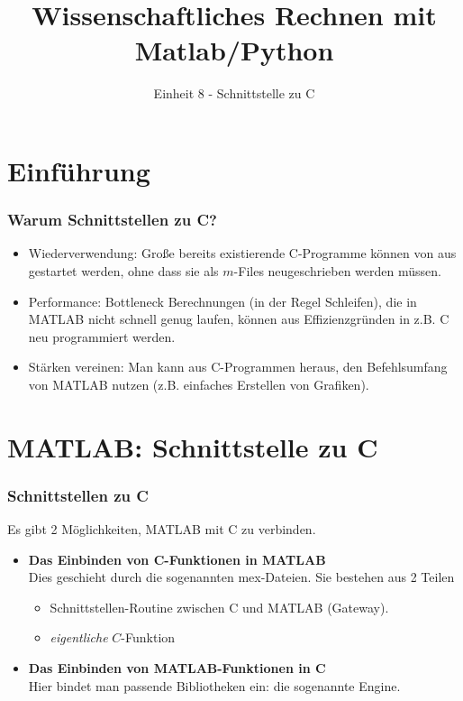 \documentclass[hyperref={xetex}]{beamer}
\title{Wissenschaftliches Rechnen mit Matlab/Python}
\subtitle{Einheit 8 - Schnittstelle zu C}
\begin{document}
\titlepage
\section{Einführung}
%
%
%
%
\begin{frame}[fragile]\frametitle{Warum Schnittstellen zu C?}
\begin{itemize}
\item \alert{Wiederverwendung}: Gro{\ss}e bereits existierende C-Programme k\"onnen von  aus
  gestartet werden, ohne dass sie als $m$-Files neugeschrieben werden
  m\"ussen. 
\item \alert{Performance}: Bottleneck Berechnungen (in der Regel Schleifen), die in MATLAB nicht
  schnell genug laufen, k\"onnen aus Effizienzgr\"unden in z.B. C neu programmiert
  werden. 
\item \alert{Stärken vereinen}: Man kann aus C-Programmen heraus, den Befehlsumfang von MATLAB nutzen (z.B. einfaches Erstellen von Grafiken).
\end{itemize}
\end{frame}


\section{MATLAB: Schnittstelle zu C}
%
%
\begin{frame}[fragile]\frametitle{Schnittstellen zu C}
Es gibt 2 M\"oglichkeiten, MATLAB mit C zu verbinden. 
\begin{itemize}
\item \textbf{Das Einbinden von C-Funktionen in MATLAB}\\ Dies geschieht durch die sogenannten
      \alert{mex-Dateien}. Sie bestehen aus 2 Teilen 
\begin{itemize}
\item  Schnittstellen-Routine zwischen C und MATLAB (Gateway).
\item \textit{eigentliche} $C$-Funktion
\end{itemize}

\item \textbf{Das Einbinden von MATLAB-Funktionen in C}\\ Hier bindet
      man passende Bibliotheken ein: die sogenannte \alert{Engine}.
\end{itemize}
\end{frame}
%
%
\end{document}
